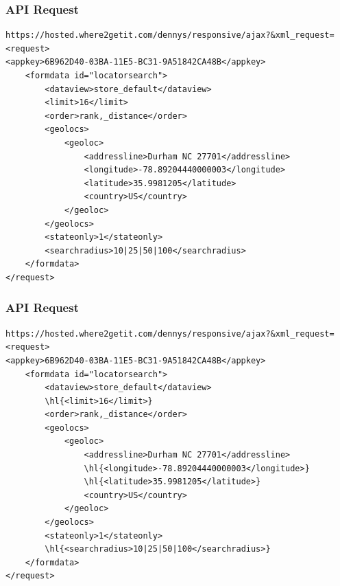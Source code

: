 \documentclass[12pt]{beamer}
\begin{document}


\begin{frame}[fragile]
\frametitle{API Request}


{\scriptsize

\begin{Verbatim}
https://hosted.where2getit.com/dennys/responsive/ajax?&xml_request=
<request>
<appkey>6B962D40-03BA-11E5-BC31-9A51842CA48B</appkey>
    <formdata id="locatorsearch">
        <dataview>store_default</dataview>
        <limit>16</limit>
        <order>rank,_distance</order>
        <geolocs>
            <geoloc>
                <addressline>Durham NC 27701</addressline>
                <longitude>-78.89204440000003</longitude>
                <latitude>35.9981205</latitude>
                <country>US</country>
            </geoloc>
        </geolocs>
        <stateonly>1</stateonly>
        <searchradius>10|25|50|100</searchradius>
    </formdata>
</request>
\end{Verbatim}
}

\end{frame}


\begin{frame}[fragile]
\frametitle{API Request}

{\scriptsize
\begin{Verbatim}[commandchars=\\\{\}]
https://hosted.where2getit.com/dennys/responsive/ajax?&xml_request=
<request>
<appkey>6B962D40-03BA-11E5-BC31-9A51842CA48B</appkey>
    <formdata id="locatorsearch">
        <dataview>store_default</dataview>
        \hl{<limit>16</limit>}
        <order>rank,_distance</order>
        <geolocs>
            <geoloc>
                <addressline>Durham NC 27701</addressline>
                \hl{<longitude>-78.89204440000003</longitude>}
                \hl{<latitude>35.9981205</latitude>}
                <country>US</country>
            </geoloc>
        </geolocs>
        <stateonly>1</stateonly>
        \hl{<searchradius>10|25|50|100</searchradius>}
    </formdata>
</request>
\end{Verbatim}
}

\end{frame}
\end{document}
